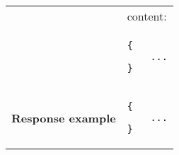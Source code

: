 \begin{adjustwidth}{1cm}{}
\begin{longtable}{|c|l|}
             & content: \\
            & \begin{minipage}[t]{0.5\textwidth}
                \begin{adjustwidth}{1.5cm}{}
                \begin{verbatim}
{
    ...
}
                \end{verbatim}
                \end{adjustwidth}
              \end{minipage} \\
              \hline
            \hline
             \textbf{Response example} & 
              \begin{minipage}[t]{0.5\textwidth}
                \begin{adjustwidth}{1.5cm}{}
                \begin{verbatim}
{
    ...
}
                \end{verbatim}
                \end{adjustwidth}
              \end{minipage} \\
              \hline
        \end{longtable}
    \end{adjustwidth}

